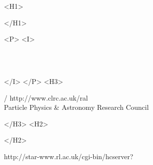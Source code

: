 \begin{htmlonly}
   \xlabel{}
   \begin{rawhtml} <H1> \end{rawhtml}
      \stardoctitle
   \begin{rawhtml} </H1> \end{rawhtml}


   \begin{rawhtml} <P> <I> \end{rawhtml}
   \stardoccategory \stardocnumber \\
   \stardocauthors \\
   \stardocdate
   \begin{rawhtml} </I> </P> <H3> \end{rawhtml}
       /
                        {http://www.clrc.ac.uk/ral} \\
      Particle Physics \& Astronomy Research Council \\
   \begin{rawhtml} </H3> <H2> \end{rawhtml}
   \begin{rawhtml} </H2> \end{rawhtml}
      {http://star-www.rl.ac.uk/cgi-bin/hcserver?\stardocsource}\\


\end{htmlonly}

